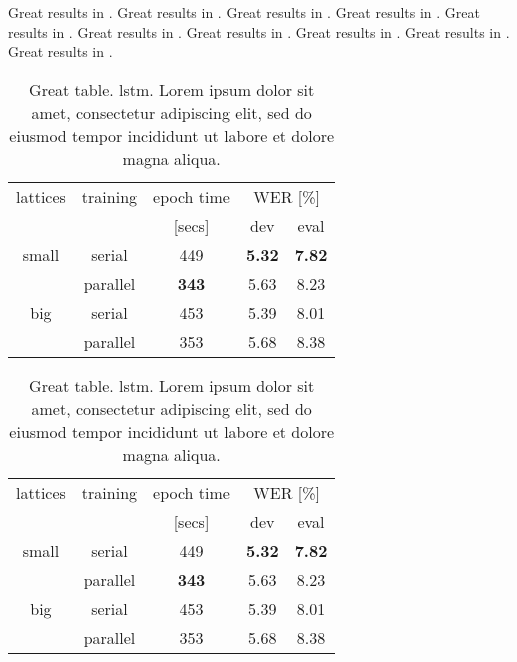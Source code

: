 Great results in .
Great results in .
Great results in .
Great results in .
Great results in .
Great results in .
Great results in .
Great results in .
Great results in .
Great results in .


\begin{table}
\centering
\caption{Great table. \Gls{lstm}.
Lorem ipsum dolor sit amet, consectetur adipiscing elit,
sed do eiusmod tempor incididunt ut labore et dolore magna aliqua.}
\label{tab:chap5:sth0}
\begin{tabular}{|c|c|c|c|c|}
\hline
lattices & training & epoch time & \multicolumn{2}{c|}{WER [\%]} \\
{}       & {}       & [secs]  & dev & eval \\ \hline \hline
small    & serial & 449  & \textbf{5.32} & \textbf{7.82} \\ \cline{2-5}
{}       & parallel & \textbf{343}  & 5.63 & 8.23 \\ \hline \hline
big      & serial   &   453        & 5.39 & 8.01 \\ \cline{2-5}
{}       & parallel &   353        & 5.68 & 8.38 \\ \hline
\end{tabular}
\end{table}


\begin{table}
\centering
\caption{Great table. \Gls{lstm}.
Lorem ipsum dolor sit amet, consectetur adipiscing elit,
sed do eiusmod tempor incididunt ut labore et dolore magna aliqua.}
\label{tab:chap5:sth1}
\begin{tabular}{|c|c|c|c|c|}
\hline
lattices & training & epoch time & \multicolumn{2}{c|}{WER [\%]} \\
{}       & {}       & [secs]  & dev & eval \\ \hline \hline
small    & serial & 449  & \textbf{5.32} & \textbf{7.82} \\ \cline{2-5}
{}       & parallel & \textbf{343}  & 5.63 & 8.23 \\ \hline \hline
big      & serial   &   453        & 5.39 & 8.01 \\ \cline{2-5}
{}       & parallel &   353        & 5.68 & 8.38 \\ \hline
\end{tabular}
\end{table}


